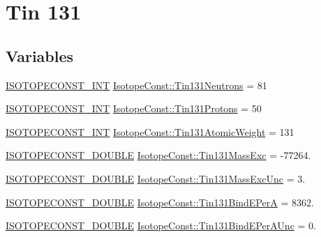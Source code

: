 \hypertarget{group___isotope_const-_tin-_sn131}{}\section{Tin 131}
\label{group___isotope_const-_tin-_sn131}
\subsection*{Variables}
\begin{DoxyCompactItemize}
\item 
\mbox{\hyperlink{group___isotope_const-_macros_ga5f18360b3e99483a35c32d789e62621c}{I\+S\+O\+T\+O\+P\+E\+C\+O\+N\+S\+T\+\_\+\+I\+NT}} \mbox{\hyperlink{group___isotope_const-_tin-_sn131_gaeebbbfd106851f76d4cc36c0352f2afc}{Isotope\+Const\+::\+Tin131\+Neutrons}} = 81
\item 
\mbox{\hyperlink{group___isotope_const-_macros_ga5f18360b3e99483a35c32d789e62621c}{I\+S\+O\+T\+O\+P\+E\+C\+O\+N\+S\+T\+\_\+\+I\+NT}} \mbox{\hyperlink{group___isotope_const-_tin-_sn131_gafff1955ce0beea9377dc5ab3fc5da9de}{Isotope\+Const\+::\+Tin131\+Protons}} = 50
\item 
\mbox{\hyperlink{group___isotope_const-_macros_ga5f18360b3e99483a35c32d789e62621c}{I\+S\+O\+T\+O\+P\+E\+C\+O\+N\+S\+T\+\_\+\+I\+NT}} \mbox{\hyperlink{group___isotope_const-_tin-_sn131_gad2f0c6c9692c13fc2ffca5f14fe9cc88}{Isotope\+Const\+::\+Tin131\+Atomic\+Weight}} = 131
\item 
\mbox{\hyperlink{group___isotope_const-_macros_ga8f45a7272ce02c0b4c65c44636ed719a}{I\+S\+O\+T\+O\+P\+E\+C\+O\+N\+S\+T\+\_\+\+D\+O\+U\+B\+LE}} \mbox{\hyperlink{group___isotope_const-_tin-_sn131_gaa216cc3fdce410b7589f5f4705a855d7}{Isotope\+Const\+::\+Tin131\+Mass\+Exc}} = -\/77264.
\item 
\mbox{\hyperlink{group___isotope_const-_macros_ga8f45a7272ce02c0b4c65c44636ed719a}{I\+S\+O\+T\+O\+P\+E\+C\+O\+N\+S\+T\+\_\+\+D\+O\+U\+B\+LE}} \mbox{\hyperlink{group___isotope_const-_tin-_sn131_gaac80081d1e0c045df7f1fecefcd39bb4}{Isotope\+Const\+::\+Tin131\+Mass\+Exc\+Unc}} = 3.
\item 
\mbox{\hyperlink{group___isotope_const-_macros_ga8f45a7272ce02c0b4c65c44636ed719a}{I\+S\+O\+T\+O\+P\+E\+C\+O\+N\+S\+T\+\_\+\+D\+O\+U\+B\+LE}} \mbox{\hyperlink{group___isotope_const-_tin-_sn131_gad7054a283aaaf5c9ca97a3d6a1944da7}{Isotope\+Const\+::\+Tin131\+Bind\+E\+PerA}} = 8362.
\item 
\mbox{\hyperlink{group___isotope_const-_macros_ga8f45a7272ce02c0b4c65c44636ed719a}{I\+S\+O\+T\+O\+P\+E\+C\+O\+N\+S\+T\+\_\+\+D\+O\+U\+B\+LE}} \mbox{\hyperlink{group___isotope_const-_tin-_sn131_gadbcd71faa351ea87a0864764eddbc29d}{Isotope\+Const\+::\+Tin131\+Bind\+E\+Per\+A\+Unc}} = 0.

\end{DoxyCompactItemize}
